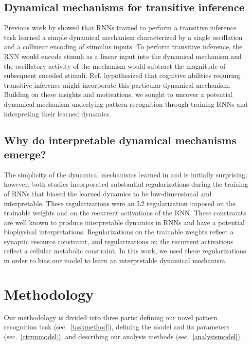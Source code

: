 \documentclass[conference]{IEEEtran}
\begin{document}
\subsection{Dynamical mechanisms for transitive inference}

Previous work by \cite{kay2022neural} showed that RNNs trained to perform a transitive inference task learned a simple dynamical mechanism characterized by a single oscillation and a collinear encoding of stimulus inputs. To perform transitive inference, the RNN would encode stimuli as a linear input into the dynamical mechanism and the oscillatory activity of the mechanism would subtract the magnitude of subsequent encoded stimuli. Ref. \cite{kay2022neural} hypothesized that cognitive abilities requiring transitive inference might incorporate this particular dynamical mechanism. Building on these insights and motivations, we sought to uncover a potential dynamical mechanism underlying pattern recognition through training RNNs and interpreting their learned dynamics.

\subsection{Why do interpretable dynamical mechanisms emerge?}
\label{interpretablemotifs}

The simplicity of the dynamical mechanisms learned in \cite{driscoll2022flexible} and \cite{kay2022neural} is initially surprising; however, both studies incorporated substantial regularizations during the training of RNNs that biased the learned dynamics to be low-dimensional and interpretable. These regularizations were an L2 regularization imposed on the trainable weights and on the recurrent activations of the RNN. These constraints are well known to produce interpretable dynamics in RNNs and have a potential biophysical interpretations\cite{sussillo2015neural,cueva2018emergence}. Regularizations on the trainable weights reflect a synaptic resource constraint, and regularizations on the recurrent activations reflect a cellular metabolic constraint. In this work, we used these regularizations in order to bias our model to learn an interpretable dynamical mechanism.

\section{Methodology}
Our methodology is divided into three parts: defining our novel pattern recognition task (sec.~\ref{taskmethod}), defining the model and its parameters (sec.~\ref{ctrnnmodel}), and describing our analysis methods (sec.~\ref{analysismodel}).
\end{document}
